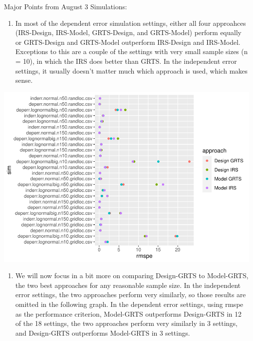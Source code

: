 \documentclass[]{elsarticle} %
\providecommand{\tightlist}{%
  \setlength{\itemsep}{0pt}\setlength{\parskip}{0pt}}
\begin{document}
Major Points from August 3 Simulations:

\begin{enumerate}
\def\labelenumi{\arabic{enumi}.}
\tightlist
\item
  In most of the dependent error simulation settings, either all four
  approahces (IRS-Design, IRS-Model, GRTS-Design, and GRTS-Model)
  perform equally or GRTS-Design and GRTS-Model outperform IRS-Design
  and IRS-Model. Exceptions to this are a couple of the settings with
  very small sample sizes (n = 10), in which the IRS does better than
  GRTS. In the independent error settings, it usually doesn't matter
  much which approach is used, which makes sense.
\end{enumerate}

\includegraphics{SpatialDVM_Manuscript_files/figure-latex/unnamed-chunk-3-1.pdf}

\begin{enumerate}
\def\labelenumi{\arabic{enumi}.}
\setcounter{enumi}{1}
\tightlist
\item
  We will now focus in a bit more on comparing Design-GRTS to
  Model-GRTS, the two best approaches for any reasonable sample size. In
  the independent error settings, the two approaches perform very
  similarly, so those results are omitted in the following graph. In the
  dependent error settings, using rmspe as the performance criterion,
  Model-GRTS outperforms Design-GRTS in 12 of the 18 settings, the two
  approaches perform very similarly in 3 settings, and Design-GRTS
  outperforms Model-GRTS in 3 settings.
\end{enumerate}
\end{document}
